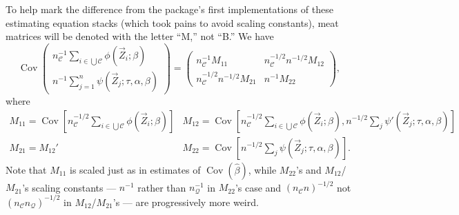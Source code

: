 \documentclass{article}
\begin{document}
To help mark the difference from the package's first implementations of these estimating equation stacks (which took pains to avoid scaling constants), 
meat matrices will be denoted with the letter ``M,'' not ``B.''
We have
\[
\operatorname{Cov}\left(
     \begin{array}{c}
       n_{\mathcal{C}}^{-1}\sum_{i\in \bigcup \mathcal{C}}\phi(\vec{Z}_{i}; \beta )\\
       n^{-1}\sum_{j=1}^{n}\psi(\vec{Z}_{j}; \tau, \alpha, \beta )
     \end{array}
\right) = \left(
  \begin{array}{cc}
    n_{\mathcal{C}}^{-1}M_{11}& n_{\mathcal{C}}^{-1/2}n^{-1/2} M_{12}\\
    n_{\mathcal{C}}^{-1/2}n^{-1/2} M_{21} & n^{-1}M_{22}
  \end{array}
\right),
\]
where
\[
  \begin{array}{cc}
    M_{11}  = \operatorname{Cov}[n_{\mathcal{C}}^{-1/2}\sum_{i\in \bigcup
             \mathcal{C}} \phi(\vec{Z}_{i}; \beta )] &
                                                                  M_{12}=
                                                                  \operatorname{Cov}[n_{\mathcal{C}}^{-1/2}\sum_{i\in \bigcup
             \mathcal{C}}\phi(\vec{Z}_{i};
                                                                  \beta
                                                                  ), n^{-1/2}\sum_{j}\psi'(\vec{Z}_{j}; \tau, \alpha, \beta )]\\
    M_{21}=M_{12}' & M_{22} = \operatorname{Cov}[n^{-1/2}\sum_{j}\psi(\vec{Z}_{j};
                     \tau, \alpha, \beta )] .
    \end{array}
\]
Note that $M_{11}$ is scaled just as in estimates of $\operatorname{Cov}(\hat\beta)$, while $M_{22}$'s and
$M_{12}$/$M_{21}$'s scaling constants --- $n^{-1}$ rather than
$n_{\mathcal{Q}}^{-1}$ in $M_{22}$'s
case and $(n_{\mathcal{C}}n)^{-1/2}$ not $(n_{\mathcal{C}} n_{\mathcal{Q}})^{-1/2}$ in $M_{12}$/$M_{21}$'s --- are progressively more weird.
\end{document}
